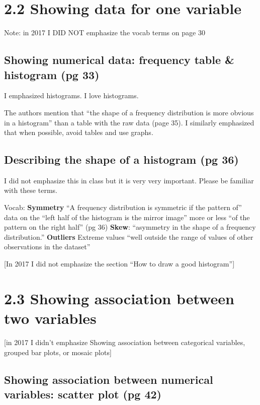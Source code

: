 \documentclass[]{book}
\theoremstyle{definition}
\theoremstyle{definition}
\theoremstyle{definition}
\theoremstyle{remark}
\begin{document}
\section{2.2 Showing data for one
variable}\label{showing-data-for-one-variable}

Note: in 2017 I DID NOT emphasize the vocab terms on page 30

\subsection{Showing numerical data: frequency table \& histogram (pg
33)}\label{showing-numerical-data-frequency-table-histogram-pg-33}

I emphasized histograms. I love histograms.

The authors mention that ``the shape of a frequency distribution is more
obvious in a histogram'' than a table with the raw data (page 35). I
similarly emphasized that when possible, avoid tables and use graphs.

\subsection{Describing the shape of a histogram (pg
36)}\label{describing-the-shape-of-a-histogram-pg-36}

I did not emphasize this in class but it is very very important. Please
be familiar with these terms.

Vocab: \textbf{Symmetry} ``A frequency distribution is symmetric if the
pattern of'' data on the ``left half of the histogram is the mirror
image'' more or less ``of the pattern on the right half'' (pg 36)
\textbf{Skew}: ``asymmetry in the shape of a frequency distribution.''
\textbf{Outliers} Extreme values ``well outside the range of values of
other observations in the dataset''

{[}In 2017 I did not emphasize the section ``How to draw a good
histogram''{]}

\section{2.3 Showing association between two
variables}\label{showing-association-between-two-variables}

{[}in 2017 I didn't emphasize Showing association between categorical
variables, grouped bar plots, or mosaic plots{]}

\subsection{Showing association between numerical variables: scatter
plot (pg
42)}\label{showing-association-between-numerical-variables-scatter-plot-pg-42}
\end{document}
